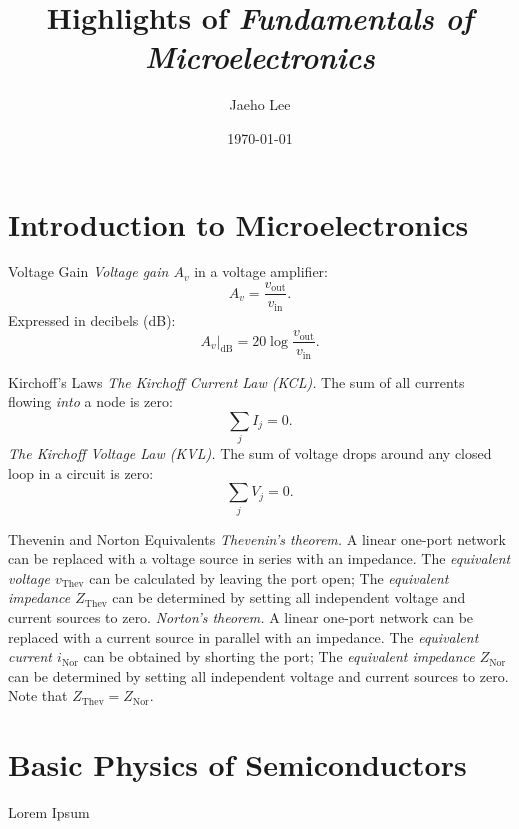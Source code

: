 \documentclass{highlights}
\title{Highlights of \textit{Fundamentals of Microelectronics}}
\author{Jaeho Lee}
\date{\today}
\begin{document}
\maketitle

\section{Introduction to Microelectronics}
\begin{concept}{Voltage Gain}
  \emph{Voltage gain $A_v$} in a voltage amplifier:
  \begin{equation}
    A_v = \frac{v_\mathrm{out}}{v_\mathrm{in}}.
  \end{equation}
  Expressed in decibels (dB):
  \begin{equation}
    A_v|_{\mathrm{dB}} = 20 \log \frac{v_\mathrm{out}}{v_\mathrm{in}}.
  \end{equation}
\end{concept}

\begin{concept}{Kirchoff's Laws}
  \emph{The Kirchoff Current Law (KCL).} The sum of all currents flowing \emph{into} a node is zero:
  \begin{equation}
    \sum_j I_j = 0.
  \end{equation}
  \tcbline
  \emph{The Kirchoff Voltage Law (KVL).} The sum of voltage drops around any closed loop in a circuit is zero:
  \begin{equation}
    \sum_j V_j = 0.
  \end{equation}
\end{concept}

\begin{concept}{Thevenin and Norton Equivalents}
  \emph{Thevenin's theorem.} A linear one-port network can be replaced with a voltage source in series with an impedance.
  The \emph{equivalent voltage $v_\mathrm{Thev}$} can be calculated by leaving the port open;
  The \emph{equivalent impedance $Z_\mathrm{Thev}$} can be determined by setting all independent voltage and current sources to zero.
  \tcbline
  \emph{Norton's theorem.} A linear one-port network can be replaced with a current source in parallel with an impedance.
  The \emph{equivalent current $i_\mathrm{Nor}$} can be obtained by shorting the port;
  The \emph{equivalent impedance $Z_\mathrm{Nor}$} can be determined by setting all independent voltage and current sources to zero.
  \tcbline
  Note that $Z_\mathrm{Thev} = Z_\mathrm{Nor}$.
\end{concept}

\section{Basic Physics of Semiconductors}
\begin{concept}{Lorem Ipsum}
  \lipsum[1]
\end{concept}
\end{document}
